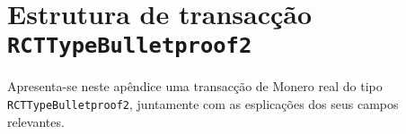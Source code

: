 \appendix


\chapter{Estrutura de transacção {\tt RCTTypeBulletproof2}}
\label{appendix:RCTTypeBulletproof2}

Apresenta-se neste apêndice uma transacção de Monero real do tipo {\tt RCTTypeBulletproof2}, juntamente com as esplicações dos seus campos relevantes.

